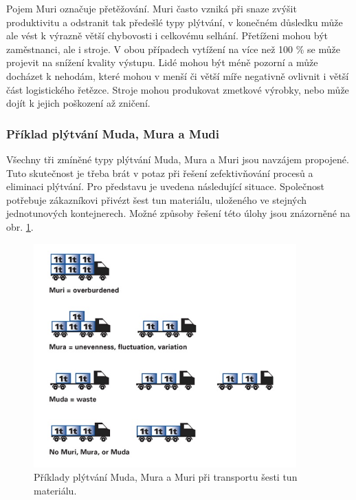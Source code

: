 Pojem Muri označuje přetěžování. Muri často vzniká při snaze zvýšit produktivitu a odstranit tak předešlé typy plýtvání, v konečném důsledku může ale vést k výrazně větší chybovosti i celkovému selhání. Přetíženi mohou být zaměstnanci, ale i stroje. V obou případech vytížení na více než 100 \% se může projevit na snížení kvality výstupu.  Lidé mohou být méně pozorní a může docházet k nehodám, které mohou v menší či větší míře negativně ovlivnit i větší část logistického řetězce. Stroje mohou produkovat zmetkové výrobky, nebo může dojít k jejich poškození až zničení.\cite{bib:Jirsak,bib:LW3}

\subsubsection*{Příklad plýtvání Muda, Mura a Mudi}

Všechny tři zmíněné typy plýtvání Muda, Mura a Muri jsou navzájem propojené. Tuto skutečnost je třeba brát v potaz při řešení zefektivňování procesů a eliminaci plýtvání. Pro představu je uvedena následující situace. Společnost potřebuje zákazníkovi přivézt šest tun materiálu, uloženého ve stejných jednotunových kontejnerech. Možné způsoby řešení této úlohy jsou znázorněné na obr. \ref{obr:log:3M}.\cite{bib:LW3}

\begin{figure}[h!]
    \centering
    \includegraphics[width=0.9\textwidth]{obrazky/3M.jpg}
    \caption{Příklady plýtvání Muda, Mura a Muri při transportu šesti tun materiálu.\cite{bib:LW3}}
    \label{obr:log:3M}
\end{figure}

